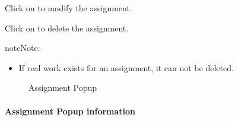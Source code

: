 \documentclass[letterpaper,10pt,english]{sphinxmanual}
\begin{document}
Click on  to modify the assignment.

Click on  to delete the assignment.

\begin{notice}{note}{Note:}\begin{itemize}
\item {} 
If real work exists for an assignment, it can not be deleted.

\end{itemize}
\end{notice}
\begin{figure}[htbp]
\centering
\capstart

\caption{Assignment Popup}\end{figure}
\paragraph{Assignment Popup information}
\end{document}
